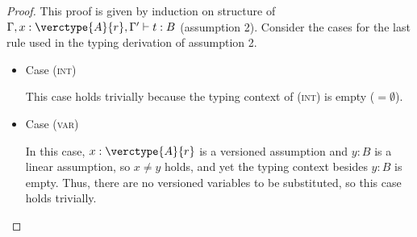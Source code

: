 \begin{proof}
This proof is given by induction on structure of $\Gamma,x:\verctype{A}{r},\Gamma' \vdash t:B$ (assumption 2).
Consider the cases for the last rule used in the typing derivation of assumption 2.

\begin{itemize}
\item Case (\textsc{int})
\begin{center}
    \begin{minipage}{.22\linewidth}
    \end{minipage}
\end{center}
This case holds trivially because the typing context of (\textsc{int}) is empty ($=\emptyset$).\\


\item Case (\textsc{var})
\begin{center}
    \begin{minipage}{.35\linewidth}
    \end{minipage}
\end{center}
In this case, $x:\verctype{A}{r}$ is a versioned assumption and $y:B$ is a linear assumption, so $x\neq y$ holds, and yet the typing context besides $y:B$ is empty.
Thus, there are no versioned variables to be substituted, so this case holds trivially.\\



\end{itemize}
\end{proof}
